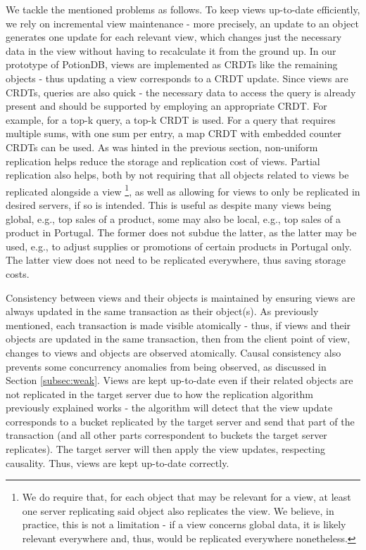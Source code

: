 We tackle the mentioned problems as follows.
To keep views up-to-date efficiently, we rely on incremental view maintenance - more precisely, an update to an object generates one update for each relevant view, which changes just the necessary data in the view without having to recalculate it from the ground up.
In our prototype of PotionDB, views are implemented as CRDTs like the remaining objects - thus updating a view corresponds to a CRDT update.
Since views are CRDTs, queries are also quick - the necessary data to access the query is already present and should be supported by employing an appropriate CRDT.
For example, for a top-k query, a top-k CRDT is used. For a query that requires multiple sums, with one sum per entry, a map CRDT with embedded counter CRDTs can be used.
As was hinted in the previous section, non-uniform replication helps reduce the storage and replication cost of views.
Partial replication also helps, both by not requiring that all objects related to views be replicated alongside a view \footnote{We do require that, for each object that may be relevant for a view, at least one server replicating said object also replicates the view. We believe, in practice, this is not a limitation - if a view concerns global data, it is likely relevant everywhere and, thus, would be replicated everywhere nonetheless.}, as well as allowing for views to only be replicated in desired servers, if so is intended.
This is useful as despite many views being global, e.g., top sales of a product, some may also be local, e.g., top sales of a product in Portugal. The former does not subdue the latter, as the latter may be used, e.g., to adjust supplies or promotions of certain products in Portugal only.
The latter view does not need to be replicated everywhere, thus saving storage costs.


Consistency between views and their objects is maintained by ensuring views are always updated in the same transaction as their object(s).
As previously mentioned, each transaction is made visible atomically - thus, if views and their objects are updated in the same transaction, then from the client point of view, changes to views and objects are observed atomically.
Causal consistency also prevents some concurrency anomalies from being observed, as discussed in Section \ref{subsec:weak}.
Views are kept up-to-date even if their related objects are not replicated in the target server due to how the replication algorithm previously explained works - the algorithm will detect that the view update corresponds to a bucket replicated by the target server and send that part of the transaction (and all other parts correspondent to buckets the target server replicates).
The target server will then apply the view updates, respecting causality.
Thus, views are kept up-to-date correctly.

